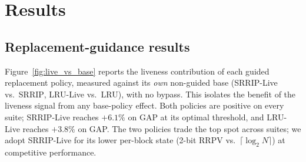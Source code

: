 \documentclass[conference]{IEEEtran}
\newcommand{\srrip}{\textsc{SRRIP}\xspace}
\newcommand{\ipv}{\textsc{IPV}\xspace}
\newcommand{\lru}{\textsc{LRU}\xspace}
\newcommand{\rrpv}{\textsc{RRPV}\xspace}
\begin{document}

\section{Results}
\label{sec:results}

\subsection{Replacement-guidance results}
\label{sec:repl_results}

Figure~\ref{fig:live_vs_base} reports the liveness contribution of each guided
replacement policy, measured against its \emph{own} non-guided base
(\srrip-Live vs.\ \srrip, \lru-Live vs.\ \lru), with no bypass.
This isolates the benefit of the liveness signal from any base-policy effect.
Both policies are positive on every suite; \srrip-Live reaches $+6.1\%$ on GAP at
its optimal threshold, and \lru-Live reaches $+3.8\%$ on GAP. The two policies
trade the top spot across suites; we adopt \srrip-Live for its lower per-block state
(2-bit \rrpv vs.\ $\lceil\log_2 N\rceil$) at competitive performance.
\end{document}
